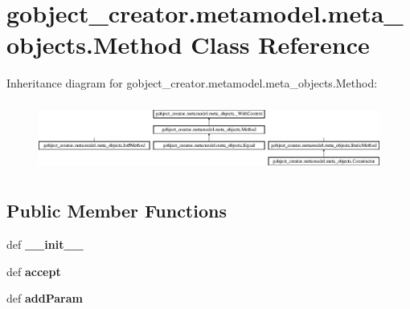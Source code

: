 \hypertarget{classgobject__creator_1_1metamodel_1_1meta__objects_1_1Method}{
\section{gobject\_\-creator.metamodel.meta\_\-objects.Method Class Reference}
\label{classgobject__creator_1_1metamodel_1_1meta__objects_1_1Method}
}
Inheritance diagram for gobject\_\-creator.metamodel.meta\_\-objects.Method:\begin{figure}[H]
\begin{center}
\leavevmode
\includegraphics[height=2.29039cm]{classgobject__creator_1_1metamodel_1_1meta__objects_1_1Method}
\end{center}
\end{figure}
\subsection*{Public Member Functions}
\begin{DoxyCompactItemize}
\item 
\hypertarget{classgobject__creator_1_1metamodel_1_1meta__objects_1_1Method_a764ce52c717e55b85e7c4c3dc2f9890f}{
def {\bfseries \_\-\_\-init\_\-\_\-}}
\label{classgobject__creator_1_1metamodel_1_1meta__objects_1_1Method_a764ce52c717e55b85e7c4c3dc2f9890f}

\item 
\hypertarget{classgobject__creator_1_1metamodel_1_1meta__objects_1_1Method_af62237ebbf8ca8a9e10b8cf987b9a616}{
def {\bfseries accept}}
\label{classgobject__creator_1_1metamodel_1_1meta__objects_1_1Method_af62237ebbf8ca8a9e10b8cf987b9a616}

\item 
\hypertarget{classgobject__creator_1_1metamodel_1_1meta__objects_1_1Method_a640f8ef3b5d5fac1a33cc3c5e9253bfc}{
def {\bfseries addParam}}
\label{classgobject__creator_1_1metamodel_1_1meta__objects_1_1Method_a640f8ef3b5d5fac1a33cc3c5e9253bfc}

\end{DoxyCompactItemize}
